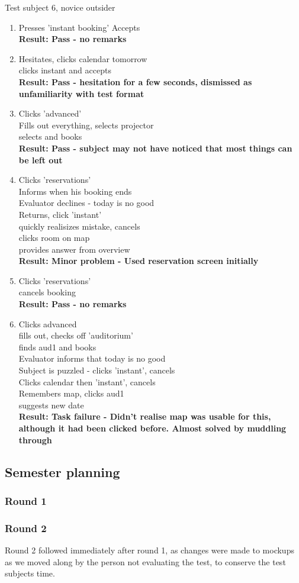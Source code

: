 Test subject 6, novice outsider
\begin{enumerate}
\item Presses 'instant booking'
Accepts \\
\textbf{Result: Pass - no remarks}
\item Hesitates, clicks calendar tomorrow \\
clicks instant and accepts \\
\textbf{Result: Pass - hesitation for a few seconds, dismissed as unfamiliarity with test format}
\item Clicks 'advanced' \\
Fills out everything, selects projector \\
selects and books \\
\textbf{Result: Pass - subject may not have noticed that most things can be left out}
\item Clicks 'reservations' \\
Informs when his booking ends \\
Evaluator declines - today is no good \\
Returns, click 'instant' \\
quickly realisizes mistake, cancels \\
clicks room on map \\
provides answer from overview \\
\textbf{Result: Minor problem - Used reservation screen initially}
\item Clicks 'reservations' \\
cancels booking \\
\textbf{Result: Pass - no remarks}
\item Clicks advanced \\
fills out, checks off 'auditorium' \\
finds aud1 and books \\
Evaluator informs that today is no good \\
Subject is puzzled - clicks 'instant', cancels \\
Clicks calendar then 'instant', cancels \\
Remembers map, clicks aud1 \\
suggests new date \\
\textbf{Result: Task failure - Didn't realise map was usable for this, although it had been clicked before. Almost solved by muddling through}
\end{enumerate}

\subsection{Semester planning}

\subsubsection{Round 1}
\begingroup
\obeylines

\endgroup
\subsubsection{Round 2}
Round 2 followed immediately after round 1, as changes were made to mockups as we moved along by the person not evaluating the test, to conserve the test subjects time.
